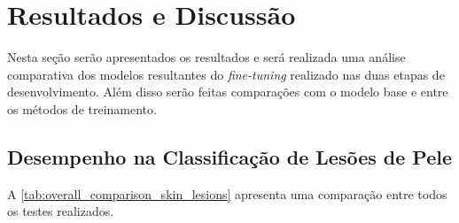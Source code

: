 \section{Resultados e Discussão}

Nesta seção serão apresentados os resultados e será realizada uma análise comparativa dos modelos resultantes do
\textit{fine-tuning} realizado nas duas etapas de desenvolvimento. Além disso serão feitas comparações com o modelo
base e entre os métodos de treinamento.

\subsection{Desempenho na Classificação de Lesões de Pele}

A \autoref{tab:overall_comparison_skin_lesions} apresenta uma comparação entre todos os testes realizados.

\clearpage

